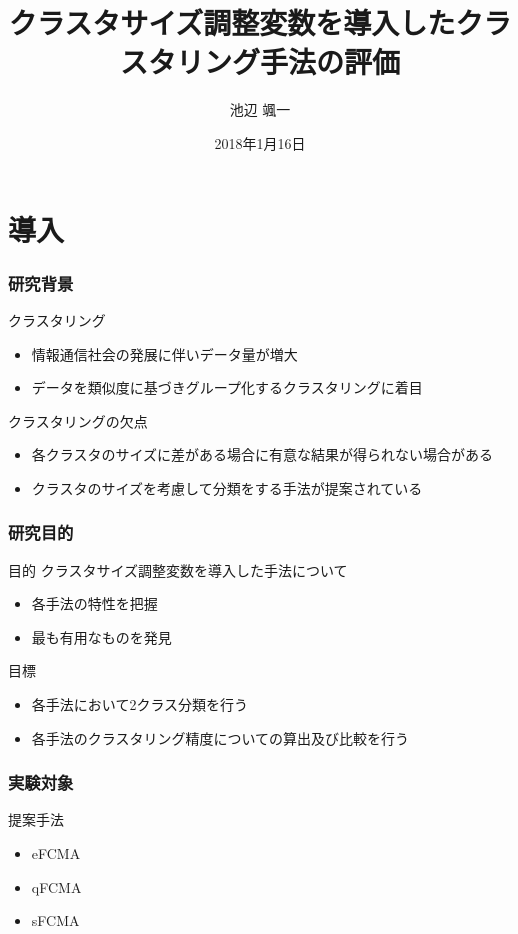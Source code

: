 \documentclass[13pt,dvipdfmx]{beamer}
\title{クラスタサイズ調整変数を導入したクラスタリング手法の評価}
\author{池辺 颯一}
\institute{芝浦工業大学 工学部 通信工学科}
\date{2018年1月16日}
\begin{document}
\begin{frame}\frametitle{}
  \titlepage
\end{frame}

\section{導入}
\begin{frame}\frametitle{研究背景}
 \begin{block}{クラスタリング}
  \begin{itemize}
   \item 情報通信社会の発展に伴いデータ量が増大
   \item データを類似度に基づきグループ化するクラスタリングに着目
  \end{itemize}
 \end{block}
 \begin{block}{クラスタリングの欠点}
  \begin{itemize}
   \item 各クラスタのサイズに差がある場合に有意な結果が得られない場合がある
   \item クラスタのサイズを考慮して分類をする手法が提案されている
  \end{itemize}
 \end{block}
\end{frame}

\begin{frame}\frametitle{研究目的}
  \begin{block}{目的}
   クラスタサイズ調整変数を導入した手法について
   \begin{itemize}
    \item 各手法の特性を把握
    \item 最も有用なものを発見
   \end{itemize}
  \end{block}
  \vspace{4mm}
  \begin{block}{目標}
   \begin{itemize}
    \item 各手法において2クラス分類を行う
    \item 各手法のクラスタリング精度についての算出及び比較を行う
   \end{itemize}
  \end{block}
\end{frame}

\begin{frame}\frametitle{実験対象}
  \begin{block}{提案手法}
    \begin{itemize}
    \item eFCMA
    \item qFCMA
    \item sFCMA
    \end{itemize}
  \end{block}
\end{frame}
\end{document}
